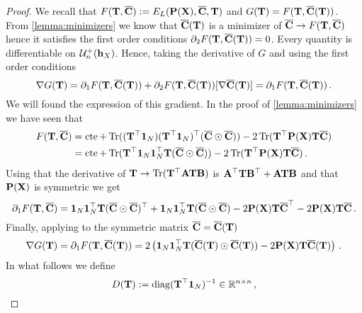 \begin{proof}
	We recall that $F({\mathbf{T}}, \overline{{\mathbf{C}}}):= E_{L}({\mathbf{P}}({\mathbf{X}}), \overline{{\mathbf{C}}}, {\mathbf{T}})$ and $G({\mathbf{T}}) = F({\mathbf{T}}, \overline{{\mathbf{C}}}({\mathbf{T}}))$.  From \cref{lemma:minimizers} we know that $\overline{{\mathbf{C}}}({\mathbf{T}})$ is a minimizer of $\overline{{\mathbf{C}}} \to F({\mathbf{T}}, \overline{{\mathbf{C}}})$ hence it satisfies the first order conditions $\partial_2 F({\mathbf{T}}, \overline{{\mathbf{C}}}({\mathbf{T}})) = 0$. Every quantity is differentiable on ${\mathcal{U}}^{+}_n({\mathbf{h}}_X)$. Hence, taking the derivative of $G$ and using the first order conditions
	\begin{equation}
		\nabla G({\mathbf{T}}) = \partial_1 F({\mathbf{T}}, \overline{{\mathbf{C}}}({\mathbf{T}}))+ \partial_2 F({\mathbf{T}}, \overline{{\mathbf{C}}}({\mathbf{T}})) [\nabla \overline{{\mathbf{C}}}({\mathbf{T}})] = \partial_1 F({\mathbf{T}}, \overline{{\mathbf{C}}}({\mathbf{T}}))\,.
	\end{equation}
	We will found the expression of this gradient. In the proof of \cref{lemma:minimizers} we have seen that
	\begin{equation}
		\begin{split}
			F({\mathbf{T}}, \overline{{\mathbf{C}}}) &= \operatorname{cte} + \operatorname{Tr}(({\mathbf{T}}^\top \bm{1}_N) ({\mathbf{T}}^\top \bm{1}_N)^\top(\overline{{\mathbf{C}}} \odot \overline{{\mathbf{C}}}))-2\operatorname{Tr}({\mathbf{T}}^\top {\mathbf{P}}({\mathbf{X}}) {\mathbf{T}} \overline {{\mathbf{C}}}) \\
			&=\operatorname{cte} + \operatorname{Tr}({\mathbf{T}}^\top \bm{1}_N \bm{1}_N^\top {\mathbf{T}}(\overline{{\mathbf{C}}} \odot \overline{{\mathbf{C}}}))-2\operatorname{Tr}({\mathbf{T}}^\top {\mathbf{P}}({\mathbf{X}}) {\mathbf{T}} \overline {{\mathbf{C}}})\,.
		\end{split}
	\end{equation}
	Using that the derivative of ${\mathbf{T}} \to \operatorname{Tr}({\mathbf{T}}^\top {\mathbf{A}} {\mathbf{T}} {\mathbf{B}})$ is ${\mathbf{A}}^\top {\mathbf{T}} {\mathbf{B}}^\top + {\mathbf{A}} {\mathbf{T}} {\mathbf{B}}$ and that ${\mathbf{P}}({\mathbf{X}})$ is symmetric we get
	\begin{equation}
		\partial_1 F({\mathbf{T}}, \overline{{\mathbf{C}}}) = \bm{1}_N \bm{1}_N^\top {\mathbf{T}} (\overline{{\mathbf{C}}} \odot \overline{{\mathbf{C}}})^\top + \bm{1}_N \bm{1}_N^\top {\mathbf{T}} (\overline{{\mathbf{C}}} \odot \overline{{\mathbf{C}}})-2 {\mathbf{P}}({\mathbf{X}}) {\mathbf{T}} \overline{{\mathbf{C}}}^\top - 2 {\mathbf{P}}({\mathbf{X}}) {\mathbf{T}} \overline{{\mathbf{C}}}\,.
	\end{equation}
	Finally, applying to the symmetric matrix $\overline{{\mathbf{C}}} = \overline{{\mathbf{C}}}({\mathbf{T}})$
	\begin{equation}
		\label{eq:gradient_expression}
		\nabla G({\mathbf{T}}) = \partial_1 F({\mathbf{T}}, \overline{{\mathbf{C}}}({\mathbf{T}})) = 2\left(\bm{1}_N \bm{1}_N^\top {\mathbf{T}} (\overline{{\mathbf{C}}}({\mathbf{T}}) \odot \overline{{\mathbf{C}}}({\mathbf{T}}))- 2 {\mathbf{P}}({\mathbf{X}}) {\mathbf{T}} \overline{{\mathbf{C}}}({\mathbf{T}})\right)\,.
	\end{equation}
	In what follows we define
	\begin{equation}
		D({\mathbf{T}}) := \operatorname{diag}({\mathbf{T}}^\top \bm{1}_N)^{-1} \in \mathbb{R}^{n \times n}\,,
	\end{equation}

\end{proof}
